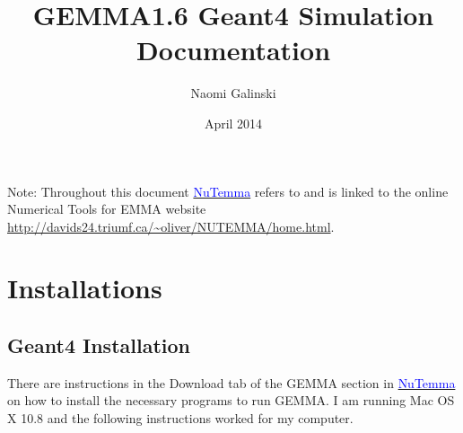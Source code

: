 \documentclass[letter,12pt]{article}
\title{GEMMA1.6 Geant4 Simulation Documentation}
\author{Naomi Galinski}
\date{April 2014}
\newcommand{\nutemma}{\href{http://davids24.triumf.ca/~oliver/NUTEMMA/home.html}{\textcolor{blue}{NuTemma}}\xspace}
\begin{document}
\onehalfspacing
\sloppy

\maketitle

\tableofcontents

\newpage
Note: Throughout this document \nutemma refers to and is linked to the online Numerical Tools for EMMA website \url{http://davids24.triumf.ca/~oliver/NUTEMMA/home.html}.

\section{Installations}
\subsection{Geant4 Installation}\label{sec:geant4}

There are instructions in the Download tab of the GEMMA section in \nutemma on how to install the necessary programs to run GEMMA. I am running Mac OS X 10.8 and the following instructions worked for my computer.
\end{document}
